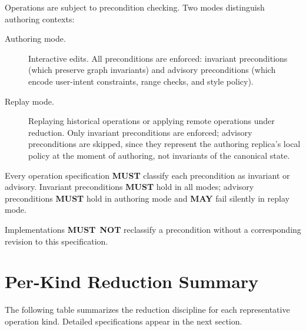 \documentclass[11pt,letterpaper]{report}
\newcounter{requirement}[chapter]
\newcommand{\MUST}{\textbf{MUST}}
\newcommand{\MUSTNOT}{\textbf{MUST}\nobreak\ \textbf{NOT}}
\newcommand{\MAY}{\textbf{MAY}}
\begin{document}
Operations are subject to precondition checking. Two modes
distinguish authoring contexts:

\begin{description}
  \item[Authoring mode.] Interactive edits. All preconditions are
    enforced: invariant preconditions (which preserve graph
    invariants) and advisory preconditions (which encode user-intent
    constraints, range checks, and style policy).
  \item[Replay mode.] Replaying historical operations or applying
    remote operations under reduction. Only invariant preconditions
    are enforced; advisory preconditions are skipped, since they
    represent the authoring replica's local policy at the moment of
    authoring, not invariants of the canonical state.
\end{description}

\begin{requirement}
  \label{req:semops:precondition-validation-modes}
  Every operation specification \MUST{} classify each precondition
  as invariant or advisory. Invariant preconditions \MUST{} hold in
  all modes; advisory preconditions \MUST{} hold in authoring mode
  and \MAY{} fail silently in replay mode.

  Implementations \MUSTNOT{} reclassify a precondition without a
  corresponding revision to this specification.
\end{requirement}

\section{Per-Kind Reduction Summary}
\label{sec:semops:per-kind-summary}

The following table summarizes the reduction discipline for each
representative operation kind. Detailed specifications appear in
the next section.
\end{document}
